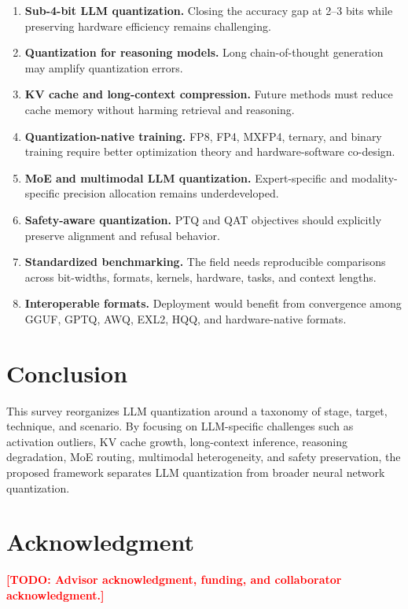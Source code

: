 \documentclass[journal,10pt]{IEEEtran}
\newcommand{\TODO}[1]{\textcolor{red}{\textbf{[TODO: #1]}}}
\begin{document}
\begin{enumerate}[leftmargin=*,label=\textbf{\arabic*.}]
  \item \textbf{Sub-4-bit LLM quantization.} Closing the accuracy gap at 2--3 bits while preserving hardware efficiency remains challenging.
  \item \textbf{Quantization for reasoning models.} Long chain-of-thought generation may amplify quantization errors.
  \item \textbf{KV cache and long-context compression.} Future methods must reduce cache memory without harming retrieval and reasoning.
  \item \textbf{Quantization-native training.} FP8, FP4, MXFP4, ternary, and binary training require better optimization theory and hardware-software co-design.
  \item \textbf{MoE and multimodal LLM quantization.} Expert-specific and modality-specific precision allocation remains underdeveloped.
  \item \textbf{Safety-aware quantization.} PTQ and QAT objectives should explicitly preserve alignment and refusal behavior.
  \item \textbf{Standardized benchmarking.} The field needs reproducible comparisons across bit-widths, formats, kernels, hardware, tasks, and context lengths.
  \item \textbf{Interoperable formats.} Deployment would benefit from convergence among GGUF, GPTQ, AWQ, EXL2, HQQ, and hardware-native formats.
\end{enumerate}

\section{Conclusion}
This survey reorganizes LLM quantization around a taxonomy of stage, target, technique, and scenario. By focusing on LLM-specific challenges such as activation outliers, KV cache growth, long-context inference, reasoning degradation, MoE routing, multimodal heterogeneity, and safety preservation, the proposed framework separates LLM quantization from broader neural network quantization.

\section*{Acknowledgment}
\TODO{Advisor acknowledgment, funding, and collaborator acknowledgment.}




\balance
\end{document}
